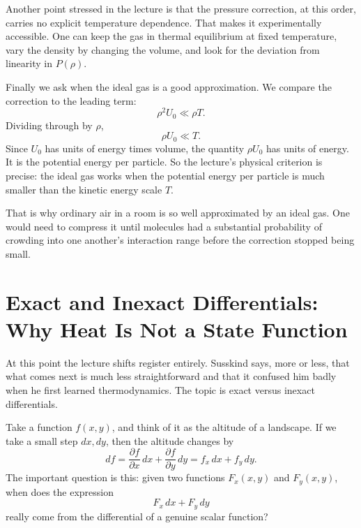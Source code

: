 Another point stressed in the lecture is that the pressure correction, at this order, carries no explicit temperature dependence. That makes it experimentally accessible. One can keep the gas in thermal equilibrium at fixed temperature, vary the density by changing the volume, and look for the deviation from linearity in \(P(\rho)\).

Finally we ask when the ideal gas is a good approximation. We compare the correction to the leading term:
\begin{equation}
\rho^2 U_0 \ll \rho T.
\end{equation}
Dividing through by \(\rho\),
\begin{equation}
\rho U_0 \ll T.
\end{equation}
Since \(U_0\) has units of energy times volume, the quantity \(\rho U_0\) has units of energy. It is the potential energy per particle. So the lecture's physical criterion is precise: the ideal gas works when the potential energy per particle is much smaller than the kinetic energy scale \(T\).

That is why ordinary air in a room is so well approximated by an ideal gas. One would need to compress it until molecules had a substantial probability of crowding into one another's interaction range before the correction stopped being small.

\section{Exact and Inexact Differentials: Why Heat Is Not a State Function}

At this point the lecture shifts register entirely. Susskind says, more or less, that what comes next is much less straightforward and that it confused him badly when he first learned thermodynamics. The topic is exact versus inexact differentials.

Take a function \(f(x,y)\), and think of it as the altitude of a landscape. If we take a small step \(dx,dy\), then the altitude changes by
\begin{equation}
df=\frac{\partial f}{\partial x}\,dx+\frac{\partial f}{\partial y}\,dy
=f_x\,dx+f_y\,dy.
\end{equation}
The important question is this: given two functions \(F_x(x,y)\) and \(F_y(x,y)\), when does the expression
\begin{equation}
F_x\,dx+F_y\,dy
\end{equation}
really come from the differential of a genuine scalar function?


